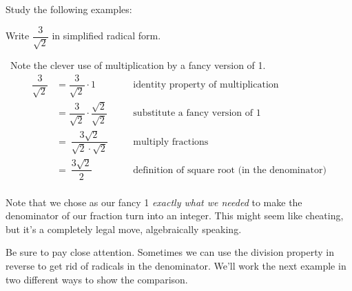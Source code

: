 Study the following examples:

\begin{boxedex}
Write $\dfrac{3}{\sqrt{2}}$ in simplified radical form.

\exsoln\ Note the clever use of multiplication by a fancy version of 1.
\[\begin{aligned}
\dfrac{3}{\sqrt{2}} &= \dfrac{3}{\sqrt{2}} \cdot 1
&&\quad\text{identity property of multiplication}\\
&= \dfrac{3}{\sqrt{2}} \cdot \dfrac{\sqrt{2}}{\sqrt{2}}
&&\quad\text{substitute a fancy version of 1}\\
&=~ \dfrac{3 \sqrt{2}}{\sqrt{2} \cdot \sqrt{2}}
&&\quad\text{multiply fractions}\\
&=~ \dfrac{3 \sqrt{2}}{2}
&&\quad\text{definition of square root (in the denominator)}\\
\end{aligned}
\]
\end{boxedex}

Note that we chose as our fancy 1 \textit{exactly what we needed} to make the denominator of our fraction turn into an integer. This might seem like cheating, but it's a completely legal move, algebraically speaking.

Be sure to pay close attention. Sometimes we can use the division property in reverse to get rid of radicals in the denominator. We'll work the next example in two different ways to show the comparison.

